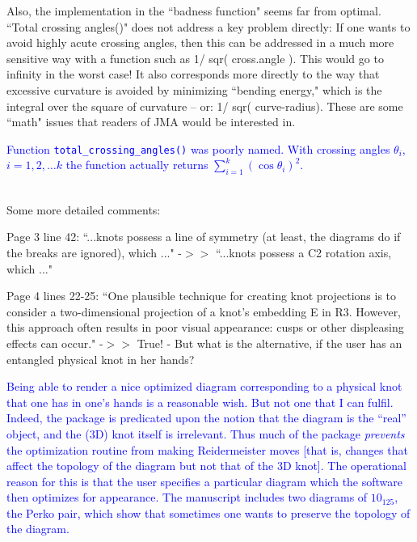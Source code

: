 \documentclass[12pt]{article}
\begin{document}
Also, the implementation in the ``badness function" seems far from
optimal.  ``Total crossing angles()" does not address a key problem
directly: If one wants to avoid highly acute crossing angles, then
this can be addressed in a much more sensitive way with a function
such as 1/ sqr( cross.angle ).  This would go to infinity in the worst
case!  It also corresponds more directly to the way that excessive
curvature is avoided by minimizing ``bending energy," which is the
integral over the square of curvature -- or: 1/ sqr( curve-radius).
These are some ``math" issues that readers of JMA would be interested
in.


\textcolor{blue}{Function {\tt total\_crossing\_angles()} was poorly
  named.  With crossing angles $\theta_i$, $i=1,2,\ldots k$ the
  function actually returns $\sum_{i=1}^k\left(\cos\theta_i\right)^2$.
  \\ \\}

Some more detailed comments:

Page 3 line 42: ``...knots possess a line of symmetry (at least, the
diagrams do if the breaks are ignored), which ..."  -$>>$ ``...knots
possess a C2 rotation axis, which ..."

Page 4 lines 22-25: ``One plausible technique for creating knot
projections is to consider a two-dimensional projection of a knot's
embedding E in R3. However, this approach often results in poor visual
appearance: cusps or other displeasing effects can occur."  -$>>$ True!
- But what is the alternative, if the user has an entangled physical
knot in her hands?

\textcolor{blue}{Being able to render a nice optimized diagram
  corresponding to a physical knot that one has in one's hands is a
  reasonable wish.  But not one that I can fulfil.  Indeed, the
  package is predicated upon the notion that the diagram is the
  ``real'' object, and the (3D) knot itself is irrelevant.  Thus much
  of the package {\em prevents} the optimization routine from making
  Reidermeister moves [that is, changes that affect the topology of
    the diagram but not that of the 3D knot].  The operational reason
  for this is that the user specifies a particular diagram which the
  software then optimizes for appearance.  The manuscript includes two
  diagrams of $10_{125}$, the Perko pair, which show that sometimes
  one wants to preserve the topology of the diagram.\\ \\}
  
\end{document}
